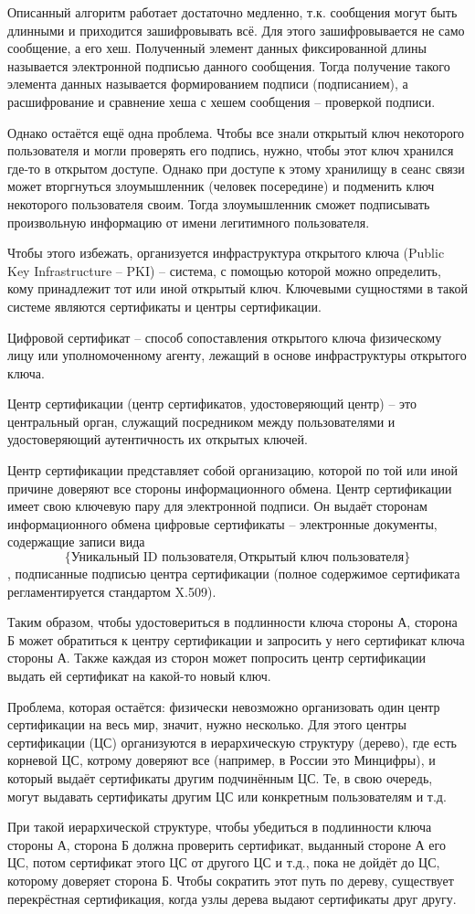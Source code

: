 Описанный алгоритм работает достаточно медленно, т.к. сообщения могут быть длинными и приходится зашифровывать всё. Для этого зашифровывается не само сообщение, а его хеш. Полученный элемент данных фиксированной длины называется электронной подписью данного сообщения. Тогда получение такого элемента данных называется формированием подписи (подписанием), а расшифрование и сравнение хеша с хешем сообщения -- проверкой подписи. 

Однако остаётся ещё одна проблема. Чтобы все знали открытый ключ некоторого пользователя и могли проверять его подпись, нужно, чтобы этот ключ хранился где-то в открытом доступе. Однако при доступе к этому хранилищу в сеанс связи может вторгнуться злоумышленник (человек посередине) и подменить ключ некоторого пользователя своим. Тогда злоумышленник сможет подписывать произвольную информацию от имени легитимного пользователя. 

Чтобы этого избежать, организуется инфраструктура открытого ключа (Public Key Infrastructure -- PKI) -- система, с помощью которой можно определить, кому принадлежит тот или иной открытый ключ. Ключевыми сущностями в такой системе являются сертификаты и центры сертификации. 

Цифровой сертификат -- способ сопоставления открытого ключа физическому лицу или уполномоченному агенту, лежащий в основе инфраструктуры открытого ключа. 

Центр сертификации (центр сертификатов, удостоверяющий центр) -- это центральный орган, служащий посредником между пользователями и удостоверяющий аутентичность их открытых ключей. 

Центр сертификации представляет собой организацию, которой по той или иной причине доверяют все стороны информационного обмена. Центр сертификации имеет свою ключевую пару для электронной подписи. Он выдаёт сторонам информационного обмена цифровые сертификаты -- электронные документы, содержащие записи вида $$\{\text{Уникальный ID пользователя}, \text{Открытый ключ пользователя}\}$$, подписанные подписью центра сертификации (полное содержимое сертификата регламентируется стандартом X.509). 

Таким образом, чтобы удостовериться в подлинности ключа стороны А, сторона Б может обратиться к центру сертификации и запросить у него сертификат ключа стороны А. Также каждая из сторон может попросить центр сертификации выдать ей сертификат на какой-то новый ключ.

Проблема, которая остаётся: физически невозможно организовать один центр сертификации на весь мир, значит, нужно несколько. Для этого центры сертификации (ЦС) организуются в иерархическую структуру (дерево), где есть корневой ЦС, котрому доверяют все (например, в России это Минцифры), и который выдаёт сертификаты другим подчинённым ЦС. Те, в свою очередь, могут выдавать сертификаты другим ЦС или конкретным пользователям и т.д. 

При такой иерархической структуре, чтобы убедиться в подлинности ключа стороны А, сторона Б должна проверить сертификат, выданный стороне А его ЦС, потом сертификат этого ЦС от другого ЦС и т.д., пока не дойдёт до ЦС, которому доверяет сторона Б. Чтобы сократить этот путь по дереву, существует перекрёстная сертификация, когда узлы дерева выдают сертификаты друг другу.